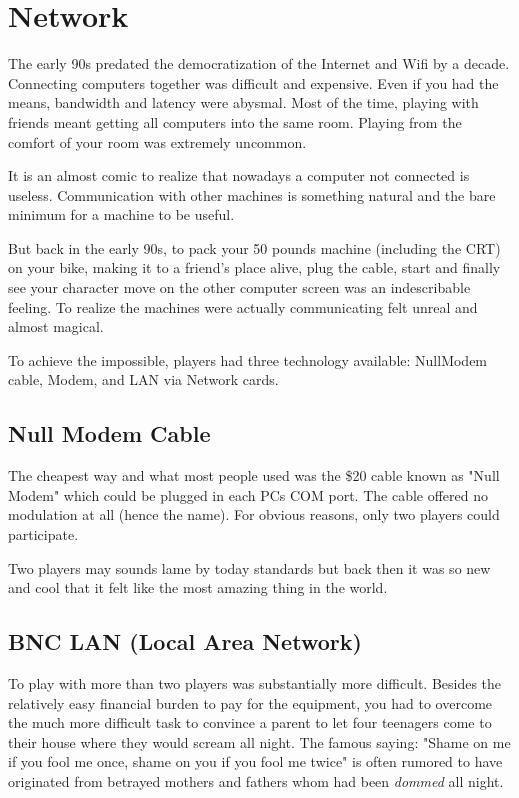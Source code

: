 \section{Network}
The early 90s predated the democratization of the Internet and Wifi by a decade. Connecting computers together was difficult and expensive. Even if you had the means, bandwidth and latency were abysmal. Most of the time, playing with friends meant getting all computers into the same room. Playing from the comfort of your room was extremely uncommon.\\
\par
It is an almost comic to realize that nowadays a computer not connected is useless. Communication with other machines is something natural and the bare minimum for a machine to be useful.\\
\par
 But back in the early 90s, to pack your 50 pounds machine (including the CRT) on your bike, making it to a friend's place alive, plug the cable, start \doom and finally see your character move on the other computer screen was an indescribable feeling. To realize the machines were actually communicating felt unreal and almost magical.\\
\par 
To achieve the impossible, players had three technology available: NullModem cable, Modem, and LAN via Network cards.









\subsection{Null Modem Cable}
The cheapest way and what most people used was the \$20 cable known as "Null Modem" which could be plugged in each PCs COM port. The cable offered no modulation at all (hence the name). For obvious reasons, only two players could participate.\\
\par 
{}
\par
 Two players may sounds lame by today standards but back then it was so new and cool that it felt like the most amazing thing in the world.







\subsection{BNC LAN (Local Area Network)}
To play with more than two players was substantially more difficult. Besides the relatively easy financial burden to pay for the equipment, you had to overcome the much more difficult task to convince a parent to let four teenagers come to their house where they would scream all night. The famous saying: "Shame on me if you fool me once, shame on you if you fool me twice" is often rumored to have originated from betrayed mothers and fathers whom had been \textit{dommed} all night.\\
\par


